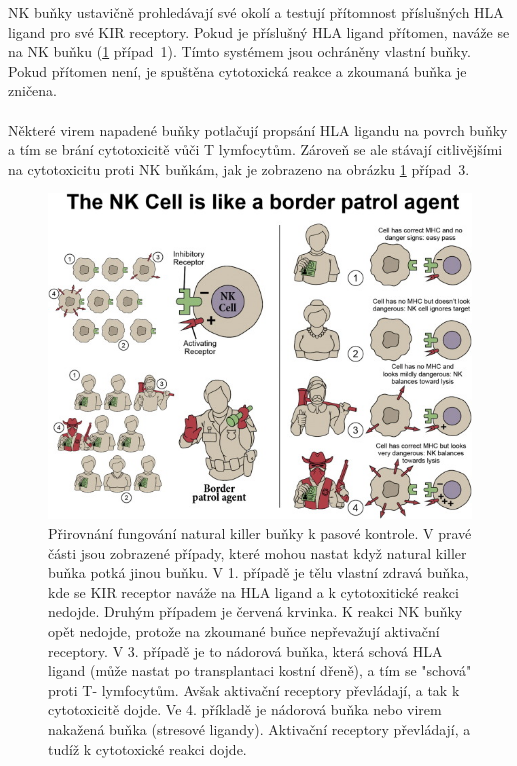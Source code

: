 \documentclass[czech,DP]{thesiskiv}
\numberwithin{equation}{section}
\begin{document}
\noindent
NK buňky ustavičně prohledávají své okolí a testují přítomnost příslušných HLA ligand pro své KIR receptory. Pokud je příslušný HLA ligand přítomen, naváže se na NK buňku (\ref{fig:kir_princip} případ~1). Tímto systémem jsou ochráněny vlastní buňky. Pokud přítomen není, je spuštěna cytotoxická reakce a zkoumaná buňka je zničena.
\\
\\
Některé virem napadené buňky potlačují propsání HLA ligandu na povrch buňky a tím se brání cytotoxicitě vůči T lymfocytům. Zároveň se ale stávají citlivějšími na cytotoxicitu proti NK buňkám, jak je zobrazeno na obrázku \ref{fig:kir_princip} případ~3.
\begin{figure}[H]		
		\centering
		\includegraphics[width=\textwidth]{./img/NK_princip.jpg}
		\caption{Přirovnání fungování natural killer buňky k pasové kontrole. V pravé části jsou zobrazené případy, které mohou nastat když natural killer buňka potká jinou buňku. V 1. případě je tělu vlastní zdravá buňka, kde se KIR receptor naváže na HLA ligand a k cytotoxitické reakci nedojde. Druhým případem je červená krvinka. K reakci NK buňky opět nedojde, protože na zkoumané buňce nepřevažují aktivační receptory. V 3. případě je to nádorová buňka, která schová HLA ligand (může nastat po transplantaci kostní dřeně), a tím se "schová" proti T- lymfocytům. Avšak aktivační receptory převládají, a tak k cytotoxicitě dojde. Ve 4. příkladě je nádorová buňka nebo virem nakažená buňka (stresové ligandy). Aktivační receptory převládají, a tudíž k cytotoxické reakci dojde.\cite{KIR_img_princip}}
		\label{fig:kir_princip}
\end{figure}
\end{document}

